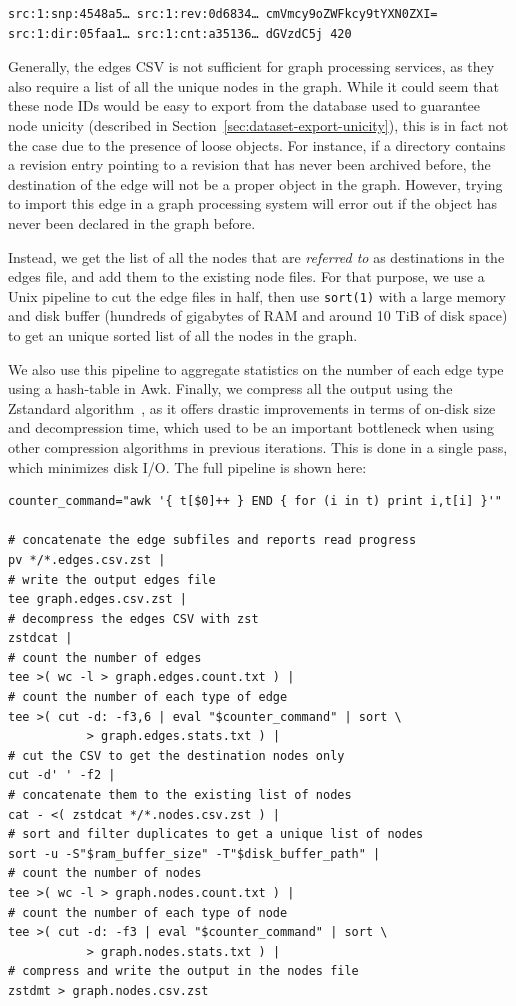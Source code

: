 \begin{verbatim}
src:1:snp:4548a5… src:1:rev:0d6834… cmVmcy9oZWFkcy9tYXN0ZXI=
src:1:dir:05faa1… src:1:cnt:a35136… dGVzdC5j 420
\end{verbatim}

Generally, the edges CSV is not sufficient for graph processing services, as
they also require a list of all the unique nodes in the graph. While it could
seem that these node IDs would be easy to export from the database used to
guarantee node unicity (described in Section~\ref{sec:dataset-export-unicity}),
this is in fact not the case due to the presence of loose objects. For
instance, if a directory contains a revision entry pointing to a revision that
has never been archived before, the destination of the edge will not be a
proper object in the graph. However, trying to import this edge in a graph
processing system will error out if the object has never been declared in the
graph before.

Instead, we get the list of all the nodes that are \emph{referred to} as
destinations in the edges file, and add them to the existing node files. For
that purpose, we use a Unix pipeline to cut the edge files in half, then use
\texttt{sort(1)} with a large memory and disk buffer (hundreds of gigabytes of
RAM and around 10 TiB of disk space) to get an unique sorted list of all the
nodes in the graph.

We also use this pipeline to aggregate statistics on the number of each edge
type using a hash-table in Awk. Finally, we compress all the output using the
Zstandard algorithm~\cite{collet2015zstd}, as it offers drastic improvements in
terms of on-disk size and decompression time, which used to be an important
bottleneck when using other compression algorithms in previous iterations. This
is done in a single pass, which minimizes disk I/O. The full pipeline is shown
here:

\begin{verbatim}
counter_command="awk '{ t[$0]++ } END { for (i in t) print i,t[i] }'"

# concatenate the edge subfiles and reports read progress
pv */*.edges.csv.zst |
# write the output edges file
tee graph.edges.csv.zst |
# decompress the edges CSV with zst
zstdcat |
# count the number of edges
tee >( wc -l > graph.edges.count.txt ) |
# count the number of each type of edge
tee >( cut -d: -f3,6 | eval "$counter_command" | sort \
           > graph.edges.stats.txt ) |
# cut the CSV to get the destination nodes only
cut -d' ' -f2 |
# concatenate them to the existing list of nodes
cat - <( zstdcat */*.nodes.csv.zst ) |
# sort and filter duplicates to get a unique list of nodes
sort -u -S"$ram_buffer_size" -T"$disk_buffer_path" |
# count the number of nodes
tee >( wc -l > graph.nodes.count.txt ) |
# count the number of each type of node
tee >( cut -d: -f3 | eval "$counter_command" | sort \
           > graph.nodes.stats.txt ) |
# compress and write the output in the nodes file
zstdmt > graph.nodes.csv.zst
\end{verbatim}

